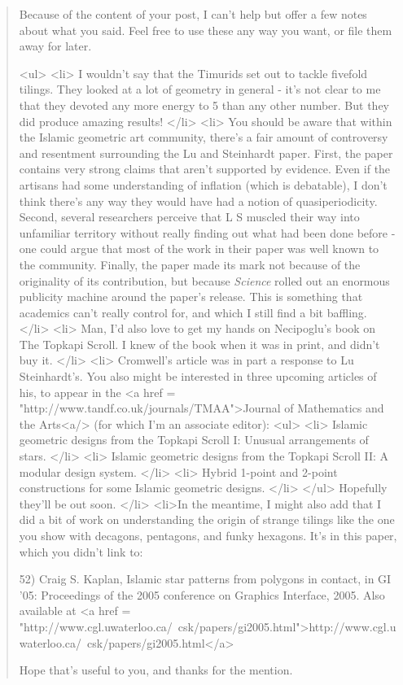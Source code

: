 \begin{quote}

 Because of the content of your post, I can't help but offer a few
notes about what you said.  Feel free to use these any way you want,
or file them away for later.

<ul>
<li>
I wouldn't say that the Timurids set out to tackle fivefold tilings.
  They looked at a lot of geometry in general - it's not clear to
  me that they devoted any more energy to 5 than any other number.
  But they did produce amazing results!
</li>
<li>
You should be aware that within the Islamic geometric art
  community, there's a fair amount of controversy and resentment
  surrounding the Lu and Steinhardt paper.  First, the paper
  contains very strong claims that aren't supported by evidence.
  Even if the artisans had some understanding of inflation (which
  is debatable), I don't think there's any way they would have had
  a notion of quasiperiodicity.  Second, several researchers
  perceive that L\text{\&} S muscled their way into unfamiliar territory
  without really finding out what had been done before - one could
  argue that most of the work in their paper was well known to the
  community.  Finally, the paper made its mark not because of the
  originality of its contribution, but because \emph{Science} rolled out
  an enormous publicity machine around the paper's release.  This
  is something that academics can't really control for, and which
  I still find a bit baffling.
</li>
<li>
Man, I'd also love to get my hands on Necipoglu's book on The
  Topkapi Scroll.  I knew of the book when it was in print, and
  didn't buy it.  
</li>
<li>
Cromwell's article was in part a response to Lu \text{\&}  Steinhardt's.
  You also might be interested in three upcoming articles of his,
  to appear in the <a href = "http://www.tandf.co.uk/journals/TMAA">Journal 
  of Mathematics and the Arts<a/> (for which I'm an associate editor):
<ul>
<li>
    Islamic geometric designs from the Topkapi Scroll I:
    Unusual arrangements of stars.
</li>
<li>
    Islamic geometric designs from the Topkapi Scroll II:
    A modular design system.
</li>
<li>
    Hybrid 1-point and 2-point constructions for some Islamic
    geometric designs.
</li>
</ul>
  Hopefully they'll be out soon.
</li>
<li>In the meantime, I might also add that I did a bit of work on
  understanding the origin of strange tilings like the one you
  show with decagons, pentagons, and funky hexagons.  It's in
  this paper, which you didn't link to:

52) Craig S. Kaplan, Islamic star patterns from polygons in contact,
in GI '05: Proceedings of the 2005 conference on Graphics Interface, 2005. 
Also available at
<a href = "http://www.cgl.uwaterloo.ca/~csk/papers/gi2005.html">http://www.cgl.uwaterloo.ca/~csk/papers/gi2005.html</a>

Hope that's useful to you, and thanks for the mention.

\end{quote}

